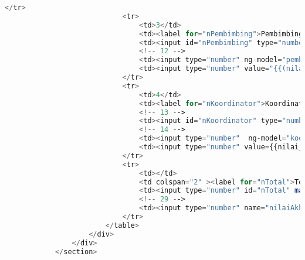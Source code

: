 \begin{lstlisting}[language=PHP,basicstyle=\tiny,caption=skripsi.php]
							</tr>
							<tr>
								<td>3</td>
								<td><label for="nPembimbing">Pembimbing</label></td>
								<td><input id="nPembimbing" type="number" max="100" ng-model="nilai_pembimbing" class="form-nilai" min=0 value="{{nilai_TTLaporanP * TTLaporanP.value / 100 + nilai_KMateriP * KMateriP.value / 100 + nilai_PMateriP * PMateriP.value / 100 + nilai_PBimbinganP * PBimbinganP.value / 100}}" disabled="disabled" /></td>
								<!-- 12 -->
								<td><input type="number" ng-model="pembimbing.value" ng-init="pembimbing.value = 20" min="0" max="100" class="form-nilai" name="bobotPembimbing" readonly="readonly" /></td>
								<td><input type="number" value="{{(nilai_TTLaporanP * TTLaporanP.value / 100 + nilai_KMateriP * KMateriP.value / 100 + nilai_PMateriP * PMateriP.value / 100 + nilai_PBimbinganP * PBimbinganP.value / 100) * pembimbing.value / 100}}" ng-model="total_pembimbing" class="form-nilai" disabled="disabled" /></td>
							</tr>
							<tr>
								<td>4</td>
								<td><label for="nKoordinator">Koordinator Skripsi</label></td>
								<!-- 13 -->
								<td><input id="nKoordinator" type="number" max="100" ng-model="nilai_koordinator" class="form-nilai" min=0 name="nilaiKoordinatorSkripsi"/></td>
								<!-- 14 -->
								<td><input type="number"  ng-model="koordinator.value" ng-init="koordinator.value = 10" min="0" max="100" class="form-nilai" name="bobotKoordinatorSkripsi" readonly="readonly" /></td>
								<td><input type="number" value={{nilai_koordinator*koordinator.value/100}} ng-model="total_koodinator" class="form-nilai" disabled="disabled" /></td>
							</tr>
							<tr>
								<td></td>
								<td colspan="2" ><label for="nTotal">Total</label></td>
								<td><input type="number" id="nTotal" max="100" disabled="disabled" value={{ketua.value+anggota.value+pembimbing.value+koordinator.value}} class="form-nilai"/></td>
								<!-- 29 -->
								<td><input type="number" name="nilaiAkhirMahasiswa" value= "{{(nilai_TTLaporanK * TTLaporanK.value / 100 + nilai_KMateriK * KMateriK.value / 100 + nilai_PMateriK * PMateriK.value / 100 + nilai_PresentasiK * presentasiK.value / 100 + nilai_PTujuanK * PTujuanK.value / 100 )* ketua.value / 100 + (nilai_TTLaporanA * TTLaporanA.value / 100 + nilai_KMateriA * KMateriA.value / 100 + nilai_PMateriA * PMateriA.value / 100 + nilai_PresentasiA * presentasiA.value / 100 + nilai_PTujuanA * PTujuanA.value / 100) * anggota.value / 100 + (nilai_TTLaporanP * TTLaporanP.value / 100 + nilai_KMateriP * KMateriP.value / 100 + nilai_PMateriP * PMateriP.value / 100 + nilai_PBimbinganP * PBimbinganP.value / 100) * pembimbing.value / 100 + nilai_koordinator * koordinator.value / 100}}" class="form-nilai"/></td>
							</tr>
						</table>
					</div> 
				</div>
			</section>
			

\end{lstlisting}

